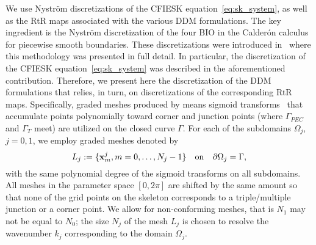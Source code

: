 \documentclass[11pt]{article}
\numberwithin{equation}{section}
\begin{document}
We use Nystr\"om discretizations of  the CFIESK equation~\eqref{eq:sk_system}, as well as the RtR maps associated with the various DDM formulations. The key ingredient is the Nystr\"om discretization of the four BIO in the Calder\'on calculus for piecewise smooth boundaries. These discretizations were introduced in~\cite{dominguez2016well} where this methodology was presented in full detail. In particular, the discretization of the CFIESK equation~\eqref{eq:sk_system} was described in the aforementioned contribution. Therefore, we present here the discretization of the DDM formulations that relies, in turn, on discretizations of the corresponding RtR maps. Specifically, graded meshes produced by means sigmoid transforms~\cite{KressCorner} that accumulate points polynomially toward corner and junction points (where $\Gamma_{PEC}$ and $\Gamma_T$ meet) are utilized on the closed curve $\Gamma$.  For each of the subdomains $\Omega_j$, $j=0,1$, we employ graded meshes denoted by  $$L_j:=\{\mathbf{x}^j_{m},m=0,\ldots,N_j-1\}\quad{\rm on}\quad \partial \Omega_j=\Gamma,$$ with the same polynomial degree of the sigmoid transforms on all subdomains. All meshes in the parameter space $[0,2\pi]$ are shifted by the same amount so that none of the grid points on the skeleton corresponds to a triple/multiple junction or a corner point. We allow for non-conforming meshes, that is $N_1$ may not be equal to $N_0$; the size $N_j$ of the mesh $L_j$ is chosen to resolve the wavenumber $k_j$ corresponding to the domain $\Omega_j$.  
\end{document}
